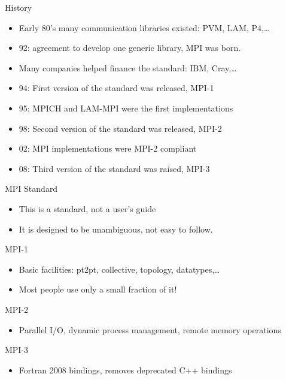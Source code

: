 \documentclass[aspectratio=43]{beamer}
\begin{document}
\begin{frame}{History}
\begin{itemize}
\item Early 80's many communication libraries existed: PVM, LAM, P4,\ldots
\item 92: agreement to develop one generic library, MPI was born.
\item Many companies helped finance the standard: IBM, Cray,\ldots
\item 94: First version of the standard was released, MPI-1
\item 95: MPICH and LAM-MPI were the first implementations
\item 98: Second version of the standard was released, MPI-2
\item 02: MPI implementations were MPI-2 compliant
\item 08: Third version of the standard was raised, MPI-3
\end{itemize}
\end{frame}

\begin{frame}{MPI Standard}
\begin{itemize}
\item This is a standard, not a user's guide
\item It is designed to be unambiguous, not easy to follow.
\end{itemize}

\begin{blue2block}{MPI-1}
\begin{itemize}
\item Basic facilities: pt2pt, collective, topology, datatypes,\ldots
\item Most people use only a small fraction of it!
\end{itemize}
\end{blue2block}

\begin{blue2block}{MPI-2}
\begin{itemize}
\item Parallel I/O, dynamic process management, remote memory operations
\end{itemize}
\end{blue2block}

\begin{blue2block}{MPI-3}
\begin{itemize}
\item Fortran 2008 bindings, removes deprecated C++ bindings
\end{itemize}
\end{blue2block}

\end{frame}
\end{document}
